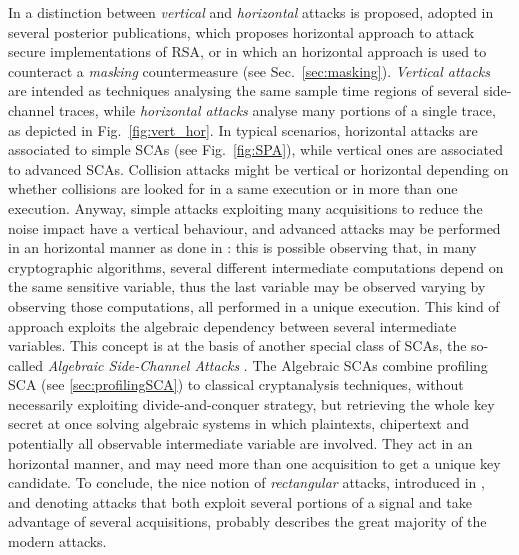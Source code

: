 In \cite{clavier2010horizontal} a distinction between \emph{vertical} and \emph{horizontal} attacks is proposed, adopted in several posterior publications, \eg \cite{bauer2013horizontal} which proposes horizontal approach to attack secure implementations of RSA, or \cite{battistello2016horizontal} in which an horizontal approach is used to counteract a \emph{masking} countermeasure (see Sec.~\ref{sec:masking}). \emph{Vertical attacks} are intended as techniques analysing the same sample time regions of several side-channel traces, while \emph{horizontal attacks} analyse many portions of a single trace, as depicted in Fig.~\ref{fig:vert_hor}. In typical scenarios,  horizontal attacks are associated to simple SCAs (see \eg Fig.~\ref{fig:SPA}), while vertical ones are associated to advanced SCAs. Collision attacks might be vertical or horizontal depending on whether collisions are looked for in a same execution or in more than one execution.  Anyway, simple attacks exploiting many acquisitions to reduce the noise impact have a vertical behaviour, and advanced attacks may be performed in an horizontal manner as done \eg in \cite{battistello2016horizontal}: this is possible observing that, in many cryptographic algorithms, several different intermediate computations depend on the same sensitive variable, thus the last variable may be observed varying by observing those computations, all performed in a unique execution. This kind of approach exploits the algebraic dependency between several intermediate variables. This concept is at the basis of another special class of SCAs, the so-called \emph{Algebraic Side-Channel Attacks} \cite{ASCA,renauld2009algebraic,Oren:2013,Oren2014,soft}. The Algebraic SCAs combine profiling SCA (see \ref{sec:profilingSCA}) to classical cryptanalysis techniques, \ie without necessarily exploiting divide-and-conquer strategy, but retrieving the whole key secret at once solving algebraic systems in which plaintexts, chipertext and potentially all observable intermediate variable are involved. They act in an horizontal manner, and may need more than one acquisition to get a unique key candidate. To conclude, the nice notion of \emph{rectangular} attacks, introduced in \cite{bauer2013horizontal}, and denoting attacks that both exploit several portions of a signal and take advantage of several acquisitions, probably describes the great majority of the modern attacks. 


